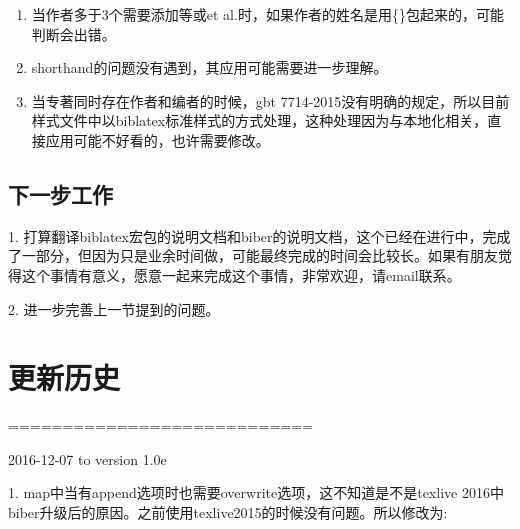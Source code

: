 \begin{enumerate}
  \item 当作者多于3个需要添加等或et al.时，如果作者的姓名是用\{\}包起来的，可能判断会出错。



  \item shorthand的问题没有遇到，其应用可能需要进一步理解。


  \item 当专著同时存在作者和编者的时候，gbt 7714-2015没有明确的规定，所以目前样式文件中以biblatex标准样式的方式处理，这种处理因为与本地化相关，直接应用可能不好看的，也许需要修改。
\end{enumerate}

\subsection{下一步工作}

1. 打算翻译biblatex宏包的说明文档和biber的说明文档，这个已经在进行中，完成了一部分，但因为只是业余时间做，可能最终完成的时间会比较长。如果有朋友觉得这个事情有意义，愿意一起来完成这个事情，非常欢迎，请email联系。

2. 进一步完善上一节提到的问题。


\section{更新历史}
============================

2016-12-07 to version 1.0e

1. map中当有append选项时也需要overwrite选项，这不知道是不是texlive 2016中biber升级后的原因。之前使用texlive2015的时候没有问题。所以修改为:
\begin{texlist}
        \map{%
            \step[fieldsource=entrykey]
            \step[fieldset=keywords, origfieldval]
            }
        \map[overwrite]{%
            \step[fieldsource=note, final]%
            \step[fieldset=keywords, fieldvalue={,}, append]
            \step[fieldset=keywords, origfieldval, append]
            }
\end{texlist}

